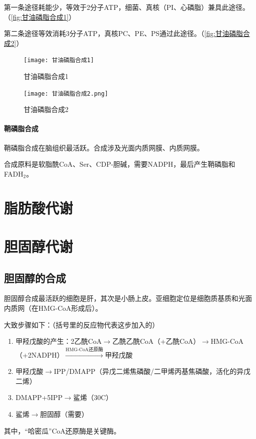第一条途径耗能少，等效于2分子ATP，细菌、真核（PI、心磷脂）兼具此途径。（\autoref{fig:甘油磷脂合成1}）

第二条途径等效消耗3分子ATP，真核PC、PE、PS通过此途径。（\autoref{fig:甘油磷脂合成2}）

\begin{figure}[htbp]
	\centering
	\texttt{[image: 甘油磷脂合成1]}
	\caption{甘油磷脂合成1}
	\label{fig:甘油磷脂合成1}
\end{figure}

\begin{figure}[htbp]
	\centering
	\texttt{[image: 甘油磷脂合成2.png]}
	\caption{甘油磷脂合成2}
	\label{fig:甘油磷脂合成2}
\end{figure}


\paragraph{鞘磷脂合成}

鞘磷脂合成在脑组织最活跃。合成涉及光面内质网膜、内质网膜。

合成原料是软脂酰CoA、Ser、CDP-胆碱，需要NADPH，最后产生鞘磷脂和FADH$_{2}$。

\section{脂肪酸代谢}

\section{胆固醇代谢}

\subsection{胆固醇的合成}

胆固醇合成最活跃的细胞是肝，其次是小肠上皮。亚细胞定位是细胞质基质和光面内质网（在HMG-CoA形成后）。

大致步骤如下：（括号里的反应物代表这步加入的）

\begin{enumerate}
	\item 甲羟戊酸的产生：2乙酰CoA$\longrightarrow$乙酰乙酰CoA（+乙酰CoA）$\longrightarrow$HMG-CoA（+2NADPH）$\xrightarrow{\text{HMG-CoA还原酶}}$甲羟戊酸
	\item 甲羟戊酸$\longrightarrow$IPP/DMAPP（异戊二烯焦磷酸/二甲烯丙基焦磷酸，活化的异戊二烯）
	\item DMAPP+5IPP$\longrightarrow$鲨烯（30C）
	\item 鲨烯$\longrightarrow$胆固醇（需要）
\end{enumerate}
其中，“哈密瓜”CoA还原酶是关键酶。

